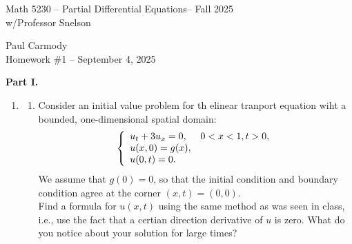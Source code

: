 \documentclass[10pt,a4paper]{report}
\newcommand{\CLASSNAME}{Math 5230 -- Partial Differential Equations}
\newcommand{\STUDENTNAME}{Paul Carmody}
\newcommand{\ASSIGNMENT}{Homework \#1 }
\newcommand{\DUEDATE}{September 4, 2025}
\newcommand{\SEMESTER}{Fall 2025}
\begin{document}
\begin{center}
	\Large{\CLASSNAME -- \SEMESTER} \\
	\large{ w/Professor Snelson}
\end{center}
\begin{center}
	\STUDENTNAME \\
	\ASSIGNMENT -- \DUEDATE\\
\end{center} 

\begin{description}
	\item \textbf{Part I.}
	\begin{enumerate}
		\item 
		\begin{enumerate}
			\item Consider an initial value problem for th elinear tranport equation wiht a bounded, one-dimensional spatial domain:
			\begin{align*}
				\left \{ \begin{array}{ll}
					u_t+3u_x=0, &0<x<1, t>0,\\
					u(x,0)=g(x),&\\
					u(0,t)=0.&
				\end{array} \right .
			\end{align*}
		We assume that $g(0)=0$, so that the initial condition and boundary condition agree at the corner $(x,t)=(0,0)$.\\
		Find a formula for $u(x,t)$ using the same method as was seen in class, i.e., use the fact that a certian direction derivative of $u$ is zero.  What do you notice about your solution for large times?
		

\end{enumerate}
\end{enumerate}
\end{description}
\end{document}
